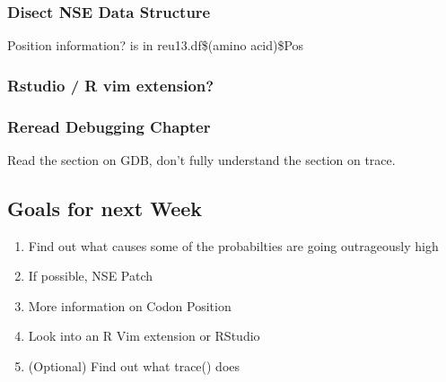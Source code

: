 \subsubsection{Disect NSE Data Structure}

Position information? is in reu13.df\$(amino acid)\$Pos

\subsubsection{Rstudio / R vim extension?}

\subsubsection{Reread Debugging Chapter}

Read the section on GDB, don't fully understand the section on trace.




\subsection{Goals for next Week}
\begin{enumerate}
\item Find out what causes some of the probabilties are going outrageously high
\item If possible, NSE Patch
\item More information on Codon Position
\item Look into an R Vim extension or RStudio
\item (Optional) Find out what trace() does
\end{enumerate}



